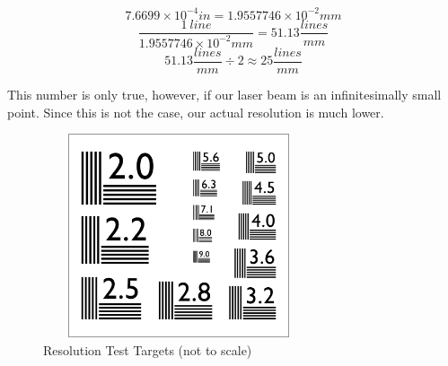 \documentclass[letterpaper, 12pt]{article}
\begin{document}
\[ 7.6699\times10^{-4}in = 1.9557746\times10^{-2}mm \]
\[ \frac{1\ line}{1.9557746\times10^{-2}mm} = 51.13\frac{lines}{mm}\]
\[ 51.13\frac{lines}{mm} \div 2 \approx 25\frac{lines}{mm} \]

\par
This number is only true, however, if our laser beam is an infinitesimally small point. Since this is not the case, our actual resolution is much lower.

\begin{figure}[H]
  \centering
  \includegraphics[width=8cm,height=6cm]{resolution_test}
  \caption[caption]{Resolution Test Targets (not to scale)}
\end{figure}
\end{document}

